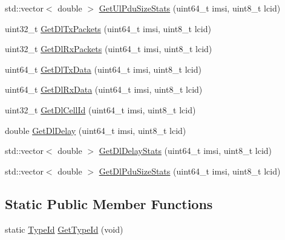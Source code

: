 \begin{DoxyCompactItemize}
\item 
std\+::vector$<$ double $>$ \hyperlink{classns3_1_1MmWaveBearerStatsCalculator_ab5899e35edd3e8e8e7384002eb95265a}{Get\+Ul\+Pdu\+Size\+Stats} (uint64\+\_\+t imsi, uint8\+\_\+t lcid)
\item 
uint32\+\_\+t \hyperlink{classns3_1_1MmWaveBearerStatsCalculator_a64148240c11d7a6fa8f592d459ec4c57}{Get\+Dl\+Tx\+Packets} (uint64\+\_\+t imsi, uint8\+\_\+t lcid)
\item 
uint32\+\_\+t \hyperlink{classns3_1_1MmWaveBearerStatsCalculator_a181a340ef4b8b422320db51df304abfb}{Get\+Dl\+Rx\+Packets} (uint64\+\_\+t imsi, uint8\+\_\+t lcid)
\item 
uint64\+\_\+t \hyperlink{classns3_1_1MmWaveBearerStatsCalculator_a17a74258a6093dcb28c3830367925489}{Get\+Dl\+Tx\+Data} (uint64\+\_\+t imsi, uint8\+\_\+t lcid)
\item 
uint64\+\_\+t \hyperlink{classns3_1_1MmWaveBearerStatsCalculator_ac7338d5ff44189712c2b7fea0f79aeb3}{Get\+Dl\+Rx\+Data} (uint64\+\_\+t imsi, uint8\+\_\+t lcid)
\item 
uint32\+\_\+t \hyperlink{classns3_1_1MmWaveBearerStatsCalculator_a92f09c4f6fd7758a181ba98acc1724ba}{Get\+Dl\+Cell\+Id} (uint64\+\_\+t imsi, uint8\+\_\+t lcid)
\item 
double \hyperlink{classns3_1_1MmWaveBearerStatsCalculator_a7641c0bc1de7c6210de2b790548b7057}{Get\+Dl\+Delay} (uint64\+\_\+t imsi, uint8\+\_\+t lcid)
\item 
std\+::vector$<$ double $>$ \hyperlink{classns3_1_1MmWaveBearerStatsCalculator_a529176f02fefbe4c13b5f307dcc5aa1f}{Get\+Dl\+Delay\+Stats} (uint64\+\_\+t imsi, uint8\+\_\+t lcid)
\item 
std\+::vector$<$ double $>$ \hyperlink{classns3_1_1MmWaveBearerStatsCalculator_ae147126fcb47973a2df03c03ac9fe900}{Get\+Dl\+Pdu\+Size\+Stats} (uint64\+\_\+t imsi, uint8\+\_\+t lcid)
\end{DoxyCompactItemize}
\subsection*{Static Public Member Functions}
\begin{DoxyCompactItemize}
\item 
static \hyperlink{classns3_1_1TypeId}{Type\+Id} \hyperlink{classns3_1_1MmWaveBearerStatsCalculator_a3eb7572ff8e04b1c277b1df041e7c390}{Get\+Type\+Id} (void)
\end{DoxyCompactItemize}
